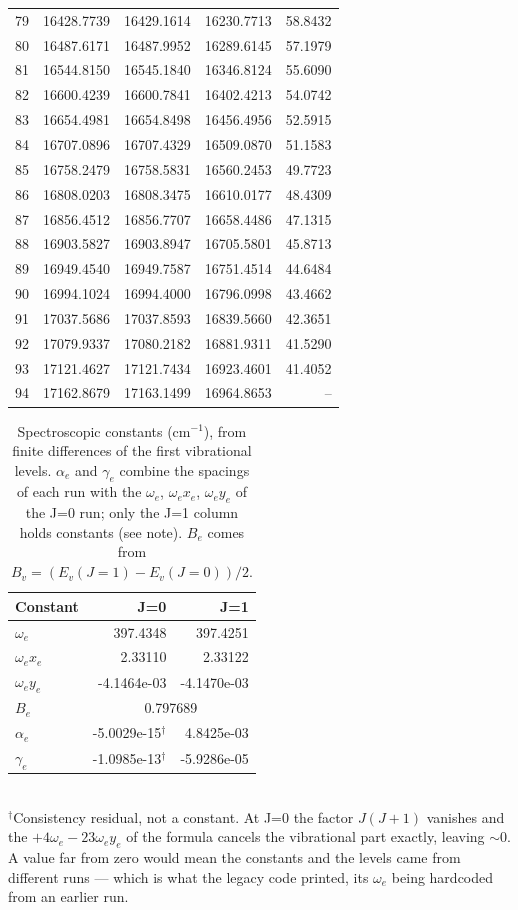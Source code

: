 \documentclass[11pt]{article}
\begin{document}
\begin{longtable}{r r r r r}
79 & 16428.7739 & 16429.1614 & 16230.7713 & 58.8432 \\
80 & 16487.6171 & 16487.9952 & 16289.6145 & 57.1979 \\
81 & 16544.8150 & 16545.1840 & 16346.8124 & 55.6090 \\
82 & 16600.4239 & 16600.7841 & 16402.4213 & 54.0742 \\
83 & 16654.4981 & 16654.8498 & 16456.4956 & 52.5915 \\
84 & 16707.0896 & 16707.4329 & 16509.0870 & 51.1583 \\
85 & 16758.2479 & 16758.5831 & 16560.2453 & 49.7723 \\
86 & 16808.0203 & 16808.3475 & 16610.0177 & 48.4309 \\
87 & 16856.4512 & 16856.7707 & 16658.4486 & 47.1315 \\
88 & 16903.5827 & 16903.8947 & 16705.5801 & 45.8713 \\
89 & 16949.4540 & 16949.7587 & 16751.4514 & 44.6484 \\
90 & 16994.1024 & 16994.4000 & 16796.0998 & 43.4662 \\
91 & 17037.5686 & 17037.8593 & 16839.5660 & 42.3651 \\
92 & 17079.9337 & 17080.2182 & 16881.9311 & 41.5290 \\
93 & 17121.4627 & 17121.7434 & 16923.4601 & 41.4052 \\
94 & 17162.8679 & 17163.1499 & 16964.8653 & -- \\
\bottomrule\end{longtable}
\begin{table}[h]\centering\caption{Spectroscopic constants (cm$^{-1}$), from finite differences of the first vibrational levels. $\alpha_e$ and $\gamma_e$ combine the spacings of each run with the $\omega_e$, $\omega_e x_e$, $\omega_e y_e$ of the J=0 run; only the J=1 column holds constants (see note). $B_e$ comes from $B_v=(E_v(J{=}1)-E_v(J{=}0))/2$.}
\begin{tabular}{l r r}\toprule Constant & J=0 & J=1 \\\midrule
$\omega_e$ & 397.4348 & 397.4251 \\
$\omega_e x_e$ & 2.33110 & 2.33122 \\
$\omega_e y_e$ & -4.1464e-03 & -4.1470e-03 \\
\midrule
$B_e$ & \multicolumn{2}{c}{0.797689} \\
$\alpha_e$ & -5.0029e-15$^{\dagger}$ & 4.8425e-03 \\
$\gamma_e$ & -1.0985e-13$^{\dagger}$ & -5.9286e-05 \\
\bottomrule\end{tabular}
\\[2pt]{\footnotesize $^{\dagger}$Consistency residual, not a constant. At J=0 the factor $J(J+1)$ vanishes and the $+4\omega_e-23\omega_ey_e$ of the formula cancels the vibrational part exactly, leaving $\sim$0. A value far from zero would mean the constants and the levels came from different runs --- which is what the legacy code printed, its $\omega_e$ being hardcoded from an earlier run.}
\end{table}
\end{document}
